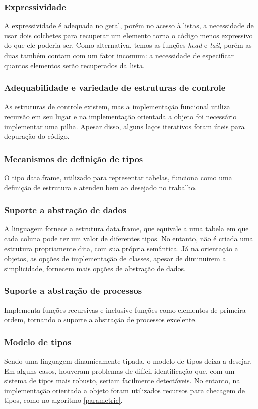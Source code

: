 \documentclass[rel_mlp]{iiufrgs}
\begin{document}
\subsubsection{Expressividade}
A expressividade é adequada no geral, porém no acesso à listas, a necessidade de usar dois colchetes para recuperar um elemento torna o código menos expressivo
do que ele poderia ser. Como alternativa, temos as funções \textit{head} e \textit{tail}, porém as duas também contam com um fator incomum:
a necessidade de especificar quantos elementos serão recuperados da lista.

\subsubsection{Adequabilidade e variedade de estruturas de controle}
As estruturas de controle existem, mas a implementação funcional utiliza recursão em seu lugar e na
implementação orientada a objeto foi necessário implementar uma pilha.
Apesar disso, alguns laços iterativos foram úteis para depuração do código.

\subsubsection{Mecanismos de definição de tipos}
O tipo data.frame, utilizado para representar tabelas, funciona como uma definição de estrutura e atendeu bem ao desejado no trabalho.

\subsubsection{Suporte a abstração de dados}
A linguagem fornece a estrutura data.frame, que equivale a uma tabela em que cada coluna pode ter um valor de diferentes tipos. No entanto, não é criada uma estrutura propriamente dita, com sua própria semântica.
Já na orientação a objetos, as opções de implementação de classes, apesar de diminuirem a simplicidade,
fornecem mais opções de abstração de dados.

\subsubsection{Suporte a abstração de processos}
Implementa funções recursivas e inclusive funções como elementos de primeira ordem, tornando o suporte a abstração de processos excelente.

\subsubsection{Modelo de tipos}
Sendo uma linguagem dinamicamente tipada, o modelo de tipos deixa a desejar. Em alguns casos, houveram problemas de difícil identificação que, com um sistema de tipos mais robusto, seriam facilmente detectáveis.
No entanto, na implementação orientada a objeto foram utilizados recursos para checagem de tipos, como no algoritmo \ref{parametric}.
\end{document}
